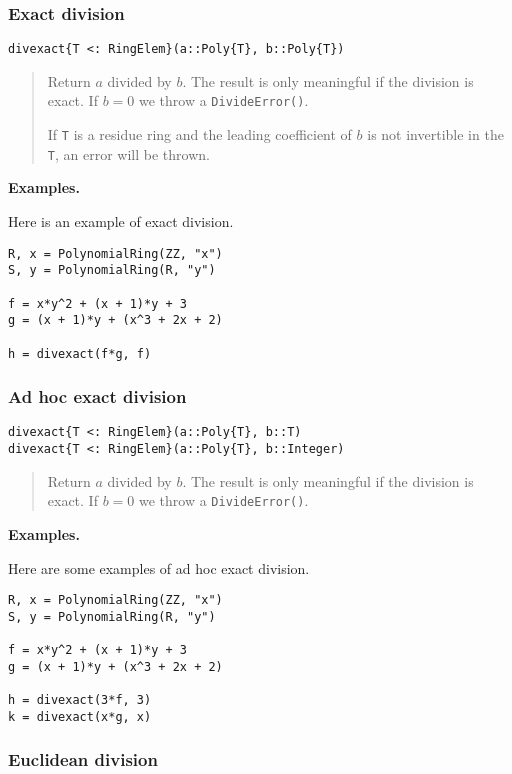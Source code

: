 \documentclass[a4paper,10pt]{article}
\newcommand{\code}{\lstinline}
\newcommand{\desc}[1]{\vspace{-3mm}\begin{quote}#1\end{quote}}
\begin{document}
\subsubsection{Exact division}

\begin{lstlisting}
divexact{T <: RingElem}(a::Poly{T}, b::Poly{T})
\end{lstlisting}

\desc{Return $a$ divided by $b$. The result is only meaningful if the division is
exact. If $b = 0$ we throw a \code{DivideError()}. 

If \code{T} is a residue ring and the leading coefficient of $b$ is not invertible
in the \code{T}, an error will be thrown.} 

\textbf{Examples.}

Here is an example of exact division.

\begin{lstlisting}
R, x = PolynomialRing(ZZ, "x")
S, y = PolynomialRing(R, "y")

f = x*y^2 + (x + 1)*y + 3
g = (x + 1)*y + (x^3 + 2x + 2)

h = divexact(f*g, f)
\end{lstlisting}

\subsubsection{Ad hoc exact division}

\begin{lstlisting}
divexact{T <: RingElem}(a::Poly{T}, b::T)
divexact{T <: RingElem}(a::Poly{T}, b::Integer)
\end{lstlisting}

\desc{Return $a$ divided by $b$. The result is only meaningful if the division is
exact. If $b = 0$ we throw a \code{DivideError()}.}

\textbf{Examples.}

Here are some examples of ad hoc exact division.

\begin{lstlisting}
R, x = PolynomialRing(ZZ, "x")
S, y = PolynomialRing(R, "y")

f = x*y^2 + (x + 1)*y + 3
g = (x + 1)*y + (x^3 + 2x + 2)

h = divexact(3*f, 3)
k = divexact(x*g, x)
\end{lstlisting}

\subsubsection{Euclidean division}
\end{document}
